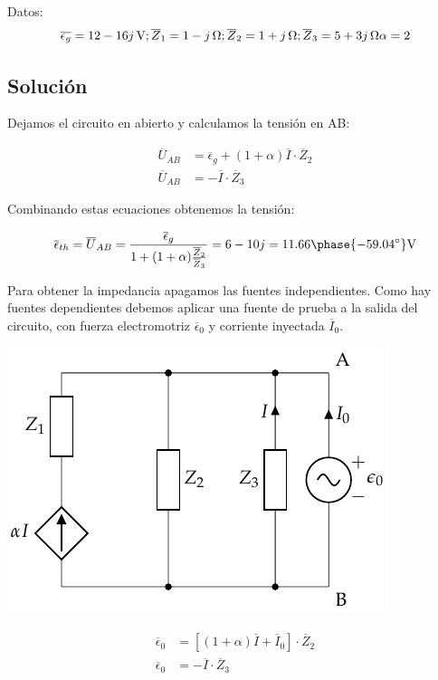 Datos:
\begin{equation*}
  \overline{\epsilon_g} = \qty[parse-numbers=false]{12 - 16j}{\volt};
  \overline{Z}_1 = \qty[parse-numbers=false]{1 - j}{\ohm};
  \overline{Z}_2 = \qty[parse-numbers=false]{1 + j}{\ohm};
  \overline{Z}_3 = \qty[parse-numbers=false]{5 + 3j}{\ohm}
  \alpha = 2
\end{equation*}


\subsection*{Solución}

Dejamos el circuito en abierto y calculamos la tensión en AB:

\begin{align*}
  \overline{U}_{AB} &= \overline{\epsilon}_g + (1 + \alpha) \overline{I} \cdot \overline{Z}_2\\
  \overline{U}_{AB} &= - \overline{I} \cdot \overline{Z}_3
\end{align*}

Combinando estas ecuaciones obtenemos la tensión:

\begin{equation*}
  \overline{\epsilon}_{th} = \overline{U}_{AB} = \frac{\overline{\epsilon}_g}{1 + (1 + \alpha) \frac{\overline{Z}_2}{\overline{Z}_3}} = 6 - 10j = 11.66\phase{\ang{-59.04}}\si{\volt}
\end{equation*}

Para obtener la impedancia apagamos las fuentes independientes. Como hay fuentes dependientes debemos aplicar una fuente de prueba a la salida del circuito, con fuerza electromotriz $\overline{\epsilon}_0$ y corriente inyectada $\overline{I}_0$.

\begin{minipage}{0.5\linewidth}
  \begin{center}
    \includegraphics{figuras/Thevenin4_fuenteprueba}
  \end{center}
\end{minipage}
\begin{minipage}{0.5\linewidth}
  \begin{align*}
    \overline{\epsilon}_0 &= [(1 + \alpha) \overline{I} + \overline{I}_0] \cdot \overline{Z}_2\\
    \overline{\epsilon}_0 &= - \overline{I}\cdot \overline{Z}_3
  \end{align*}
\end{minipage}

